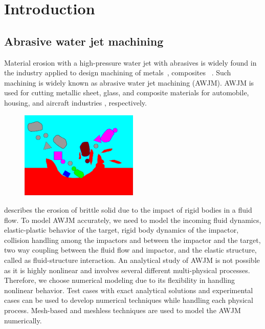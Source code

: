 \chapter{Introduction}
\label{chap:SPH}

\section{Abrasive water jet machining}
Material erosion with a high-pressure water jet with abrasives is widely found
in the industry applied to design machining of
metals~\citep{llanto_recent_2021}, composites~ \cite{alberdi_composite_2013}.
Such machining is widely known as abrasive water jet machining (AWJM). AWJM is
used for cutting metallic sheet, glass, and composite materials for automobile,
housing, and aircraft
industries \citep{alberdi_composite_2013,aich_abrasive_2014,llanto_recent_2021},
respectively.
\begin{figure}
  \centering
  \includegraphics[width=0.5\textwidth]{images/intro/images/intro_section/big_picture}
  \caption{}
\label{fig:intro-big-picture}
\end{figure}
 describes the erosion of brittle solid due to the
impact of rigid bodies in a fluid flow. To model AWJM accurately, we need to
model the incoming fluid dynamics, elastic-plastic behavior of the target, rigid
body dynamics of the impactor, collision handling among the impactors and
between the impactor and the target, two way coupling between the fluid flow and
impactor, and the elastic structure, called as fluid-structure interaction. An
analytical study of AWJM is not possible as it is highly nonlinear and involves
several different multi-physical processes. Therefore, we choose numerical
modeling due to its flexibility in handling nonlinear behavior. Test cases with
exact analytical solutions and experimental cases can be used to develop
numerical techniques while handling each physical process. Mesh-based and
meshless techniques are used to model the AWJM numerically.


